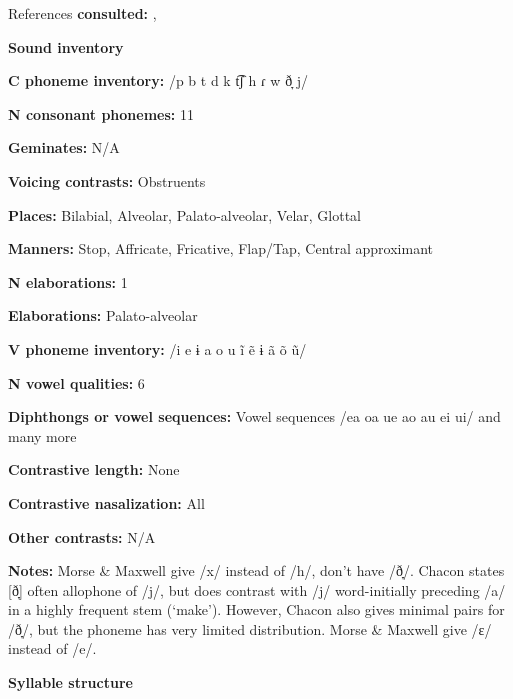 References \textbf{consulted:} \citet{Chacon2012}, \citet{MorseMaxwell1999}



\textbf{Sound inventory}



\textbf{C phoneme inventory:} /p b t d k t͡ʃ h ɾ w ð̞ j/



\textbf{N consonant phonemes:} 11



\textbf{Geminates:} N/A



\textbf{Voicing contrasts:} Obstruents



\textbf{Places:} Bilabial, Alveolar, Palato-alveolar, Velar, Glottal



\textbf{Manners:} Stop, Affricate, Fricative, Flap/Tap, Central approximant



\textbf{N elaborations:} 1



\textbf{Elaborations:} Palato-alveolar



\textbf{V phoneme inventory:} /i e ɨ a o u ĩ ẽ ɨ ã õ ũ/



\textbf{N vowel qualities:} 6



\textbf{Diphthongs or vowel sequences:} Vowel sequences /ea oa ue ao au ei ui/ and many more



\textbf{Contrastive length:} None



\textbf{Contrastive nasalization:} All



\textbf{Other contrasts:} N/A



\textbf{Notes:} Morse \& Maxwell give /x/ instead of /h/, don’t have /ð̞/. Chacon states [ð̞] often allophone of /j/, but does contrast with /j/ word-initially preceding /a/ in a highly frequent stem (‘make’). However, Chacon also gives minimal pairs for /ð̞/, but the phoneme has very limited distribution. Morse \& Maxwell give /ɛ/ instead of /e/.



\textbf{Syllable structure}



